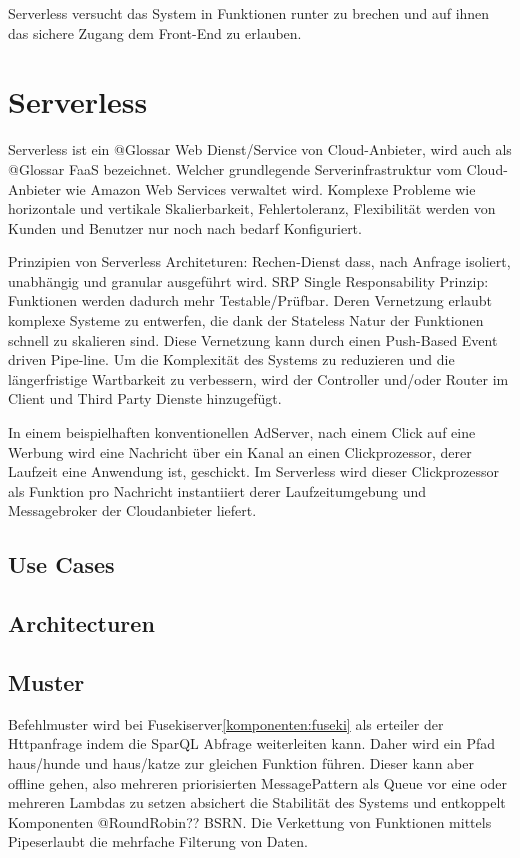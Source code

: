 \documentclass[
12pt,
english,
ngerman,
headsepline,
twoside,
openright,
numbers=noenddot,version=first
]{scrreprt}
\begin{document}
Serverless versucht das System in Funktionen runter zu brechen und auf ihnen das sichere Zugang dem Front-End zu erlauben. 

\section{Serverless}
\label{sec:serverless}

Serverless ist ein @Glossar Web Dienst/Service von Cloud-Anbieter, wird auch als @Glossar FaaS bezeichnet. Welcher grundlegende Serverinfrastruktur vom Cloud-Anbieter wie Amazon Web Services verwaltet wird. Komplexe Probleme wie horizontale und vertikale Skalierbarkeit, Fehlertoleranz, Flexibilität werden von Kunden und Benutzer nur noch nach bedarf Konfiguriert. 


Prinzipien von Serverless Architeturen: \cite{sbarski2017serverless}
Rechen-Dienst dass, nach Anfrage isoliert, unabhängig und granular ausgeführt wird. 
SRP Single Responsability Prinzip: Funktionen werden dadurch mehr Testable/Prüfbar. Deren Vernetzung erlaubt komplexe Systeme zu entwerfen, die dank der Stateless Natur der Funktionen schnell zu skalieren sind. 
Diese Vernetzung kann durch einen Push-Based Event driven Pipe-line. 
Um die Komplexität des Systems zu reduzieren und die längerfristige Wartbarkeit zu verbessern, wird der Controller und/oder Router im Client und Third Party Dienste hinzugefügt. 

In einem beispielhaften konventionellen AdServer, nach einem Click auf eine Werbung wird eine Nachricht über ein Kanal an einen Clickprozessor, derer Laufzeit eine Anwendung ist, geschickt. Im Serverless wird dieser Clickprozessor als Funktion pro Nachricht instantiiert derer Laufzeitumgebung und Messagebroker der Cloudanbieter liefert.

\subsection{Use Cases}

\subsection{Architecturen}

\subsection{Muster}

Befehlmuster wird bei Fusekiserver\ref{komponenten:fuseki} als erteiler der Httpanfrage indem die SparQL Abfrage weiterleiten kann. Daher wird ein Pfad haus/hunde und haus/katze zur gleichen Funktion führen.
Dieser kann aber offline gehen, also mehreren priorisierten MessagePattern als Queue vor eine oder mehreren Lambdas zu setzen absichert die Stabilität des Systems und entkoppelt Komponenten @RoundRobin?? BSRN.
Die Verkettung von Funktionen mittels \glqq Pipes\grqq erlaubt die mehrfache Filterung von Daten.
\end{document}
